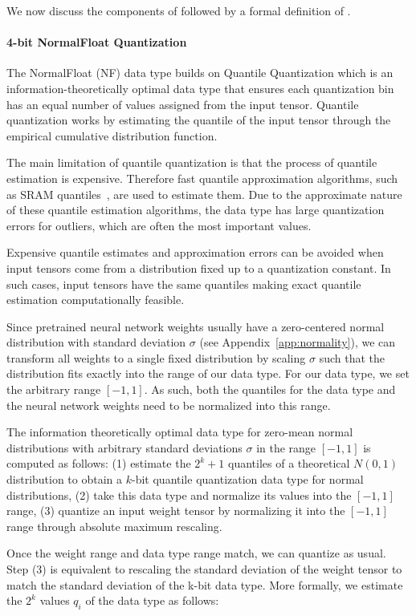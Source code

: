 We now discuss the components of \method followed by a formal definition of \method.


\paragraph{4-bit NormalFloat Quantization} The NormalFloat (NF) data type builds on Quantile Quantization \citep{dettmers2022optimizers} which is an information-theoretically optimal data type that ensures each quantization bin has an equal number of values assigned from the input tensor. Quantile quantization works by estimating the quantile of the input tensor through the empirical cumulative distribution function. 

The main limitation of quantile quantization is that the process of quantile estimation is expensive. Therefore fast quantile approximation algorithms, such as SRAM quantiles~\citep{dettmers2022optimizers}, are used to estimate them. Due to the approximate nature of these quantile estimation algorithms, the data type has large quantization errors for outliers, which are often the most important values.

Expensive quantile estimates and approximation errors can be avoided when input tensors come from a distribution fixed up to a quantization constant. In such cases, input tensors have the same quantiles making exact quantile estimation computationally feasible.

Since pretrained neural network weights usually have a zero-centered normal distribution with standard deviation $\sigma$ (see Appendix~\ref{app:normality}), we can transform all weights to a single fixed distribution by scaling $\sigma$ such that the distribution fits exactly into the range of our data type. For our data type, we set the arbitrary range $[-1, 1]$. As such, both the quantiles for the data type and the neural network weights need to be normalized into this range.

The information theoretically optimal data type for zero-mean normal distributions with arbitrary standard deviations $\sigma$ in the range $[-1, 1]$ is computed as follows: (1) estimate the $2^k+1$ quantiles of a theoretical $N(0, 1)$ distribution to obtain a $k$-bit quantile quantization data type for normal distributions, (2) take this data type and normalize its values into the $[-1, 1]$ range, (3) quantize an input weight tensor by normalizing it into the $[-1, 1]$ range through absolute maximum rescaling. 

Once the weight range and data type range match, we can quantize as usual. Step (3) is equivalent to rescaling the standard deviation of the weight tensor to match the standard deviation of the k-bit data type. More formally, we estimate the $2^k$ values $q_i$ of the data type as follows: 

